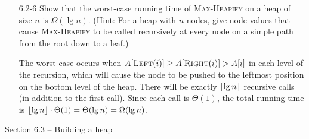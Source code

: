 \begin{enumerate}
\begin{framed}
\begin{algorithm}[H]
\SetAlgoNoEnd\DontPrintSemicolon
\BlankLine
{}
\end{algorithm}
\end{framed}

\item[6.2-6]{Show that the worst-case running time of \textsc{Max-Heapify} on a
heap of size $n$ is $\Omega(\lg n)$. (Hint: For a heap with $n$ nodes, give node
values that cause \textsc{Max-Heapify} to be called recursively at every node on
a simple path from the root down to a leaf.)}

\begin{framed}
The worst-case occurs when $A[\textsc{Left}(i)] \ge A[\textsc{Right}(i)] > A[i]$
in each level of the recursion, which will cause the node to be pushed to the
leftmost position on the bottom level of the heap. There will be exactly
$\lfloor\lg n\rfloor$ recursive calls (in addition to the first call). Since each call
is $\Theta(1)$, the total running time is
$\lfloor\lg n\rfloor \cdot \Theta(1) = \Theta(\lg n) = \Omega(\lg n)$.
\end{framed}

\end{enumerate}

\newpage

{\large Section 6.3 {--} Building a heap}

